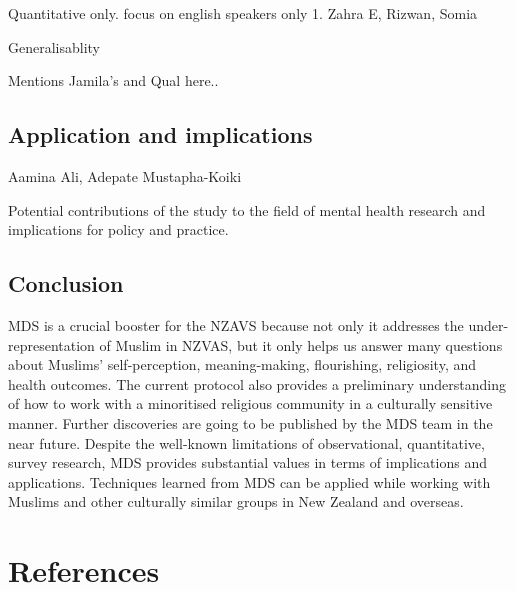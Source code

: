 \documentclass[
]{interact}
\begin{document}
Quantitative only. focus on english speakers only 1. Zahra E, Rizwan,
Somia

Generalisablity

Mentions Jamila's and Qual here..

\subsection{Application and
implications}\label{application-and-implications}

Aamina Ali, Adepate Mustapha-Koiki

Potential contributions of the study to the field of mental health
research and implications for policy and practice.

\subsection{Conclusion}\label{conclusion}

MDS is a crucial booster for the NZAVS because not only it addresses the
under-representation of Muslim in NZVAS, but it only helps us answer
many questions about Muslims' self-perception, meaning-making,
flourishing, religiosity, and health outcomes. The current protocol also
provides a preliminary understanding of how to work with a minoritised
religious community in a culturally sensitive manner. Further
discoveries are going to be published by the MDS team in the near
future. Despite the well-known limitations of observational,
quantitative, survey research, MDS provides substantial values in terms
of implications and applications. Techniques learned from MDS can be
applied while working with Muslims and other culturally similar groups
in New Zealand and overseas.

\newpage{}

\section*{References}\label{references}
\end{document}
